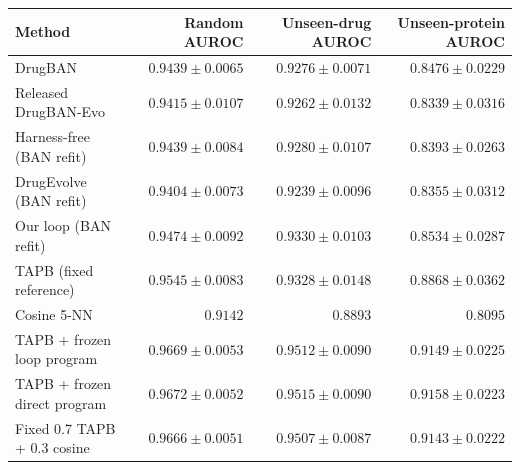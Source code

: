 \centering\footnotesize\setlength{\tabcolsep}{3pt}
\begin{tabularx}{\linewidth}{Xrrr}
\toprule
Method & Random AUROC & Unseen-drug AUROC & Unseen-protein AUROC \\
\midrule
DrugBAN & \(0.9439 \pm 0.0065\) & \(0.9276 \pm 0.0071\) & \(0.8476 \pm 0.0229\) \\
Released DrugBAN-Evo & \(0.9415 \pm 0.0107\) & \(0.9262 \pm 0.0132\) & \(0.8339 \pm 0.0316\) \\
Harness-free (BAN refit) & \(0.9439 \pm 0.0084\) & \(0.9280 \pm 0.0107\) & \(0.8393 \pm 0.0263\) \\
DrugEvolve (BAN refit) & \(0.9404 \pm 0.0073\) & \(0.9239 \pm 0.0096\) & \(0.8355 \pm 0.0312\) \\
Our loop (BAN refit) & \(0.9474 \pm 0.0092\) & \(0.9330 \pm 0.0103\) & \(0.8534 \pm 0.0287\) \\
TAPB (fixed reference) & \(0.9545 \pm 0.0083\) & \(0.9328 \pm 0.0148\) & \(0.8868 \pm 0.0362\) \\
Cosine 5-NN & \(0.9142\) & \(0.8893\) & \(0.8095\) \\
\midrule
TAPB + frozen loop program & \(0.9669 \pm 0.0053\) & \(0.9512 \pm 0.0090\) & \(0.9149 \pm 0.0225\) \\
TAPB + frozen direct program & \(0.9672 \pm 0.0052\) & \(0.9515 \pm 0.0090\) & \(0.9158 \pm 0.0223\) \\
Fixed 0.7 TAPB + 0.3 cosine & \(0.9666 \pm 0.0051\) & \(0.9507 \pm 0.0087\) & \(0.9143 \pm 0.0222\) \\
\bottomrule
\end{tabularx}
\caption{DTI AUROC on the same 50,149 training pairs and original tests. Top: 100-epoch full-data refits and fixed references. Bottom: three frozen-program transfers with no new search or training. Mean $\pm$ sample SD covers five source/refit pairs for BAN controllers, five fits for fixed neural references and the manual mixture, and five research/TAPB-fit pairs for transferred programs. TAPB uses a larger pretrained representation and is not capacity-matched to BAN; cosine is deterministic (no SD). Protocols and complete results: Appendices L and M.}
\label{tab:dti-complete-overview}
